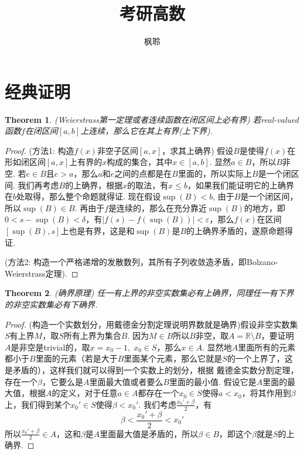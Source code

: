 \documentclass{article}
\newtheorem{theorem}{Theorem}[section]
\begin{document}
\title{考研高数}
\author{枫聆}
\maketitle
\tableofcontents

\newpage
\section{经典证明}
\begin{theorem}
\rm {\color{red} (Weierstrass第一定理或者连续函数在闭区间上必有界)} 若real-valued函数$f$在闭区间$[a,b]$上连续，那么它在其上有界(上下界).
\end{theorem}

\begin{proof}
{\color{blue} (方法1: 构造$f(x)$非空子区间$[a,x]$，求其上确界)} 假设$B$是使得$f(x)$在形如闭区间$[a,x]$上有界的$x$构成的集合，其中$x \in [a,b]$. 显然$a \in B$，所以$B$非空. 若$e \in B$且$e > a$，那么$a$和$e$之间的点都是在$B$里面的，所以实际上$B$是一个闭区间. 我们再考虑$B$的上确界，根据$x$的取法，有$x \leq b$，如果我们能证明它的上确界在$b$处取得，那么整个命题就得证. 现在假设$\sup(B) < b$, 由于$B$是一个闭区间，所以$\sup(B) \in B$. 再由于$f$是连续的，那么在充分靠近$\sup(B)$的地方，即$ 0 < s -\sup(B) < \delta$，有$|f(s) - f(\sup(B))| < \varepsilon$，那么$f(x)$在区间$[\sup(B),s]$上也是有界，这是和$\sup(B)$是$B$的上确界矛盾的，遂原命题得证.

{\color{blue} (方法2: 构造一个严格递增的发散数列，其所有子列收敛造矛盾，即Bolzano-Weierstrass定理)}.
\end{proof}

\begin{theorem}
\rm {\color{red} (确界原理)} 任一有上界的非空实数集必有上确界，同理任一有下界的非空实数集必有下确界.
\end{theorem}

\begin{proof}
{\color{blue} (构造一个实数划分，用戴德金分割定理说明界数就是确界)}假设非空实数集$S$有上界$M$，取$S$所有上界为集合$B$. 因为$M \in B$所以$B$非空，取$A = \mathbb{R} \setminus B$，要证明$A$是非空是trivial的，取$x = x_0 - 1,\; x_0 \in S$，那么$x \in A$. 显然地$A$里面所有的元素都小于$B$里面的元素（若是大于$B$里面某个元素，那么它就是$S$的一个上界了，这是矛盾的），这样我们就可以得到一个实数上的划分，根据{\color{red} 戴德金实数分割定理}，存在一个$\beta$，它要么是$A$里面最大值或者要么$B$里面的最小值. 假设它是$A$里面的最大值，根据$A$的定义，对于任意$a \in A$都存在一个$x_0 \in S$使得$a < x_0$，将其作用到$\beta$上，我们得到某个$x_0' \in S$使得$\beta < x_0'$. 我们考虑$\frac{x_0'+\beta}{2}$，有
$$
\beta < \frac{x_0' + \beta}{2} < x_0'
$$
所以$\frac{x_0' + \beta}{2} \in A$，这和$\beta$是$A$里面最大值是矛盾的，所以$\beta \in B$，即这个$\beta$就是$S$的上确界.
\end{proof}
\end{document}
